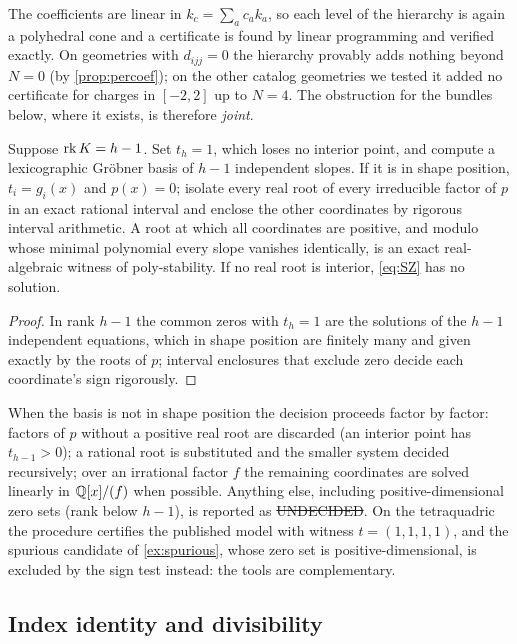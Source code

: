 The coefficients are linear in $k_c=\sum_ac_ak_a$, so each level of the hierarchy
is again a polyhedral cone and a certificate is found by linear programming and
verified exactly. On geometries with $d_{ijj}=0$ the hierarchy provably adds
nothing beyond $N=0$ (by \cref{prop:percoef}); on the other catalog geometries we
tested it added no certificate for charges in $[-2,2]$ up to $N=4$. The
obstruction for the bundles below, where it exists, is therefore \emph{joint}.

\begin{proposition}\label{prop:decision}
Suppose $\operatorname{rk} K=h-1$. Set $t_h=1$, which loses no interior point, and compute a
lexicographic Gröbner basis of $h-1$ independent slopes. If it is in shape
position, $t_i=g_i(x)$ and $p(x)=0$; isolate every real root of every irreducible
factor of $p$ in an exact rational interval and enclose the other coordinates by
rigorous interval arithmetic. A root at which all coordinates are positive, and
modulo whose minimal polynomial every slope vanishes identically, is an exact
real-algebraic witness of poly-stability. If no real root is interior, \eqref{eq:SZ}
has no solution.
\end{proposition}
\begin{proof}
In rank $h-1$ the common zeros with $t_h=1$ are the solutions of the $h-1$
independent equations, which in shape position are finitely many and given
exactly by the roots of $p$; interval enclosures that exclude zero decide each
coordinate's sign rigorously.
\end{proof}

When the basis is not in shape position the decision proceeds factor by factor:
factors of $p$ without a positive real root are discarded (an interior point has
$t_{h-1}>0$); a rational root is substituted and the smaller system decided
recursively; over an irrational factor $f$ the remaining coordinates are solved
linearly in $\mathbb{Q}[x]/(f)$ when possible. Anything else, including positive-dimensional
zero sets (rank below $h-1$), is reported as \st{UNDECIDED}. On the tetraquadric the procedure certifies the published model
with witness $t=(1,1,1,1)$, and the spurious candidate of \cref{ex:spurious}, whose
zero set is positive-dimensional, is excluded by the sign test instead: the tools
are complementary.

\subsection{Index identity and divisibility}

